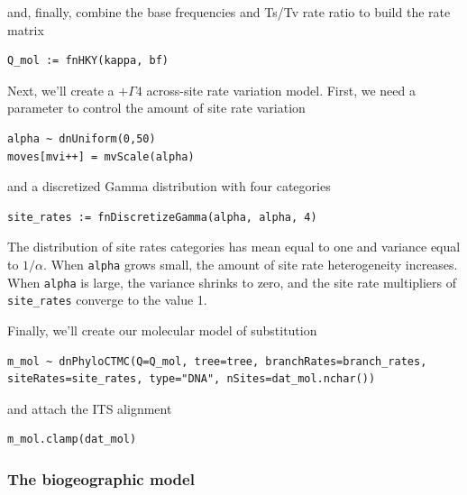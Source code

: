 and, finally, combine the base frequencies and Ts/Tv rate ratio to build the rate matrix

\begin{snugshade}
\begin{lstlisting}
Q_mol := fnHKY(kappa, bf)
\end{lstlisting}
\end{snugshade}

Next, we'll create a $+\Gamma4$ across-site rate variation model.
First, we need a parameter to control the amount of site rate variation

\begin{snugshade}
\begin{lstlisting}
alpha ~ dnUniform(0,50)
moves[mvi++] = mvScale(alpha)
\end{lstlisting}
\end{snugshade}

and a discretized Gamma distribution with four categories

\begin{snugshade}
\begin{lstlisting}
site_rates := fnDiscretizeGamma(alpha, alpha, 4)
\end{lstlisting}
\end{snugshade}

The distribution of site rates categories has mean equal to one and variance equal to $1/\alpha$.
When {\tt alpha} grows small, the amount of site rate heterogeneity increases.
When {\tt alpha} is large, the variance shrinks to zero, and the site rate multipliers of {\tt site\_rates} converge to the value 1.

Finally, we'll create our molecular model of substitution

\begin{snugshade}
\begin{lstlisting}
m_mol ~ dnPhyloCTMC(Q=Q_mol, tree=tree, branchRates=branch_rates, siteRates=site_rates, type="DNA", nSites=dat_mol.nchar())
\end{lstlisting}
\end{snugshade}

and attach the ITS alignment

\begin{snugshade}
\begin{lstlisting}
m_mol.clamp(dat_mol)
\end{lstlisting}
\end{snugshade}


\subsubsection{The biogeographic model}


